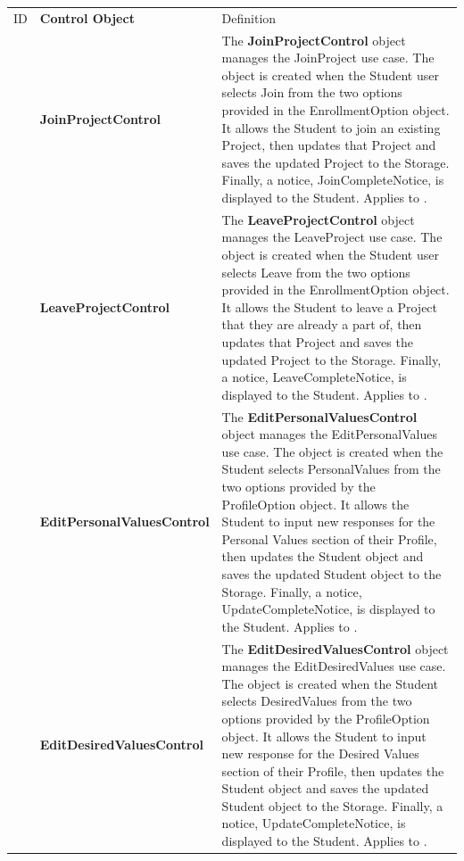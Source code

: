 \documentclass[12pt,letterpaper]{article}
\begin{document}
\begin{center}
\begin{tabu} to 
		\tableheader{}ID & Control Object & Definition\\
		 & Join\-Project\-Control & 
			The {\bf JoinProjectControl} object manages the JoinProject use case. The object is created when the Student user selects Join from the two options provided in the EnrollmentOption object. It allows the Student to join an existing Project, then updates that Project and saves the updated Project to the Storage. Finally, a notice, JoinCompleteNotice, is displayed to the Student. Applies to . \\
		
		 & Leave\-Project\-Control & 
			The {\bf LeaveProjectControl} object manages the LeaveProject use case. The object is created when the Student user selects Leave from the two options provided in the EnrollmentOption object. It allows the Student to leave a Project that they are already a part of, then updates that Project and saves the updated Project to the Storage. Finally, a notice, LeaveCompleteNotice, is displayed to the Student. Applies to . \\
		
		 & Edit\-Personal\-Values\-Control & 
			The {\bf EditPersonalValuesControl} object manages the EditPersonalValues use case. The object is created when the Student selects PersonalValues from the two options provided by the ProfileOption object. It allows the Student to input new responses for the Personal Values section of their Profile, then updates the Student object and saves the updated Student object to the Storage. Finally, a notice, UpdateCompleteNotice, is displayed to the Student. Applies to . \\
		
		 & Edit\-Desired\-Values\-Control & 
			The {\bf EditDesiredValuesControl} object manages the EditDesiredValues use case. The object is created when the Student selects DesiredValues from the two options provided by the ProfileOption object. It allows the Student to input new response for the Desired Values section of their Profile, then updates the Student object and saves the updated Student object to the Storage. Finally, a notice, UpdateCompleteNotice, is displayed to the Student. Applies to . \\
		

\end{tabu}
\end{center}
\end{document}
